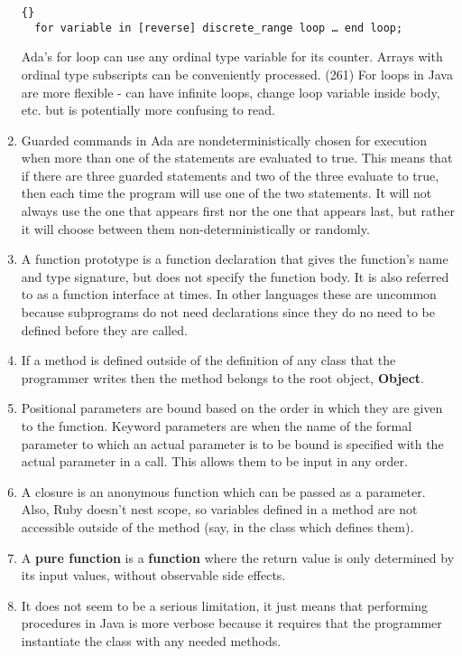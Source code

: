 \begin{enumerate}
\begin{lstlisting}{}
  for variable in [reverse] discrete_range loop … end loop; 
\end{lstlisting}

Ada’s for loop can use any ordinal type variable for its
counter. Arrays with ordinal type subscripts can be conveniently
processed. (261) For loops in Java are more flexible - can have
infinite loops, change loop variable inside body, etc. but is
potentially more confusing to read.
\item Guarded commands in Ada are nondeterministically chosen for
  execution when more than one of the statements are evaluated to
  true. This means that if there are three guarded statements and two
  of the three evaluate to true, then each time the program will use
  one of the two statements. It will not always use the one that
  appears first nor the one that appears last, but rather it will
  choose between them non-deterministically or randomly.
\item A function prototype is a function declaration that gives the
  function's name and type signature, but does not specify the
  function body. It is also referred to as a function interface at
  times. In other languages these are uncommon because subprograms do
  not need declarations since they do no need to be defined before
  they are called.
\item If a method is defined outside of the definition of any class
  that the programmer writes then the method belongs to the root
  object, \textbf{Object}.
\item Positional parameters are bound based on the order in which they
  are given to the function. Keyword parameters are when the name of
  the formal parameter to which an actual parameter is to be bound is
  specified with the actual parameter in a call. This allows them to
  be input in any order.
\item A closure is an anonymous function which can be passed as a
  parameter. Also, Ruby doesn't nest scope, so variables defined in a
  method are not accessible outside of the method (say, in the class
  which defines them).
\item A \textbf{pure function} is a \textbf{function} where the return
  value is only determined by its input values, without observable
  side effects.
\item It does not seem to be a serious limitation, it just means that
  performing procedures in Java is more verbose because it requires
  that the programmer instantiate the class with any needed methods.

\end{enumerate}
